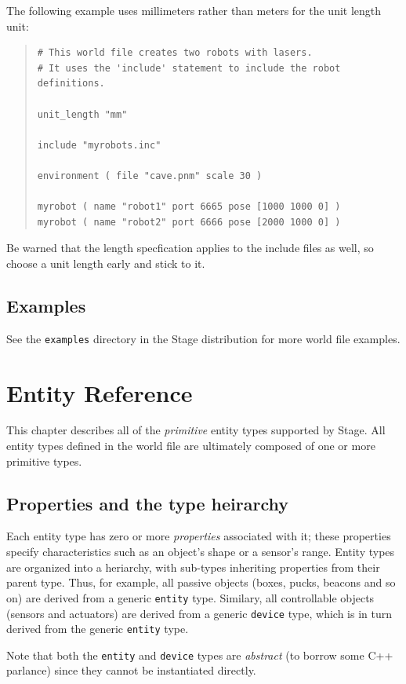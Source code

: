 \documentclass[11pt,twoside]{report}
\begin{document}
\noindent The following example uses millimeters rather than meters
for the unit length unit:
\begin{quote}
\begin{verbatim}
# This world file creates two robots with lasers.
# It uses the 'include' statement to include the robot definitions.

unit_length "mm"

include "myrobots.inc"

environment ( file "cave.pnm" scale 30 )

myrobot ( name "robot1" port 6665 pose [1000 1000 0] )
myrobot ( name "robot2" port 6666 pose [2000 1000 0] )
\end{verbatim}
\end{quote}
Be warned that the length specfication applies to the include files as well,
so choose a unit length early and stick to it.


\section{Examples}

See the {\tt examples} directory in the Stage distribution for more
world file examples.


\chapter{Entity Reference}

This chapter describes all of the {\em primitive} entity types
supported by Stage.  All entity types defined in the world file are
ultimately composed of one or more primitive types.


\section{Properties and the type heirarchy}

Each entity type has zero or more {\em properties} associated with it;
these properties specify characteristics such as an object's shape or
a sensor's range.  Entity types are organized into a heriarchy, with
sub-types inheriting properties from their parent type.  Thus, for
example, all passive objects (boxes, pucks, beacons and so on) are
derived from a generic \verb'entity' type.  Similary, all controllable
objects (sensors and actuators) are derived from a generic
\verb'device' type, which is in turn derived from the generic
\verb'entity' type.

Note that both the \verb'entity' and \verb'device' types are {\em
abstract} (to borrow some C++ parlance) since they cannot be
instantiated directly.
\end{document}
